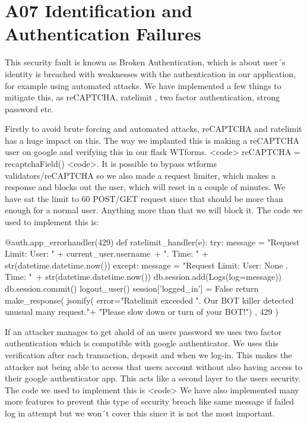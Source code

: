 \section{A07 Identification and Authentication Failures}

This security fault is known as Broken Authentication, which is about user´s identity is breached with weaknesses with the authentication in our application, for example using automated attacks. We have implemented a few things to mitigate this, as reCAPTCHA, ratelimit , two factor authentication, strong password etc.   

Firstly to avoid brute forcing and automated attacks, reCAPTCHA and ratelimit has a huge impact on this. The way we implanted this is making a reCAPTCHA user on google and verifying this in our flask WTforms. <code> reCAPTCHA = recaptchaField() <code>. It is possible to bypass wtforms validators/reCAPTCHA so we also made a request limiter, which makes a response and blocks out the user, which will reset in a couple of minutes. We have sat the limit to 60 POST/GET request since that should be more than enough for a normal user. Anything more than that we will block it. The code we used to implement this is:

\pagebreak
\begin{python}
@auth.app_errorhandler(429)
def ratelimit_handler(e):
    try:
        message = "Request Limit: User: " + current_user.username\
                  + ". Time: " + str(datetime.datetime.now())
    except:
        message = "Request Limit: User: None . Time: "\
                  + str(datetime.datetime.now())
    db.session.add(Logs(log=message))
    db.session.commit()
    logout_user()
    session['logged_in'] = False
    return make_response(
        jsonify(
            error="Ratelimit exceeded %
                  ". Our BOT killer detected unusual many request."+
                  "Please slow down or turn of your BOT!")
        , 429
    )
\end{python}

If an attacker manages to get ahold of an users password we uses two factor authentication which is compatible with google authenticator. We uses this verification after each transaction, deposit and when we log-in. This makes the attacker not being able to access that users account without also having access to their google authenticator app. This acts like a second layer to the users security.  The code we used to implement this is <code>
We have also implemented many more features to prevent this type of security breach like same message if failed log in attempt but we won´t cover this since it is not the most important. 

